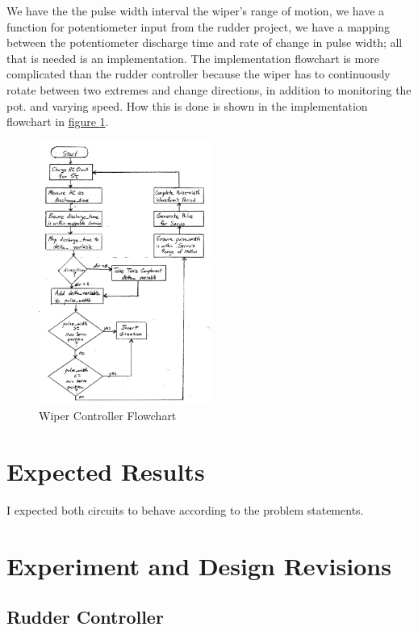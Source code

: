 \documentclass[11pt]{article}
\begin{document}
We have the the pulse width interval the wiper's range of motion,
we have a function for potentiometer input from the rudder project,
we have a mapping between the potentiometer discharge time and rate of change in pulse width;
all that is needed is an implementation. The implementation flowchart
is more complicated than the rudder controller because the wiper has to
continuously rotate between two extremes and change directions, in addition
to monitoring the pot. and varying speed. How this is done is shown in the
implementation flowchart in \hyperref[wiper-flowchart]{figure \ref{wiper-flowchart}}.

\begin{figure}[ht]
\centering
\includegraphics[width=0.5\textwidth]{wiper-flowchart.pdf}
\caption{Wiper Controller Flowchart}
\label{wiper-flowchart}
\end{figure}

\section{Expected Results}

I expected both circuits to behave according to the problem statements.

\section{Experiment and Design Revisions}

\subsection{Rudder Controller}
\end{document}
